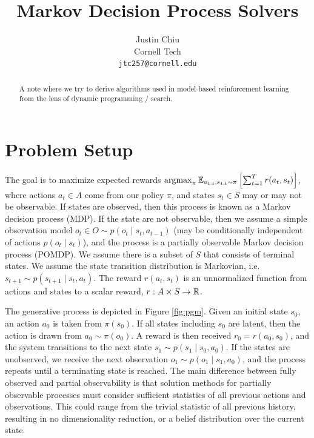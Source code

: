 \documentclass[11pt]{article}
\title{Markov Decision Process Solvers}
\author{Justin Chiu \\
  Cornell Tech \\
  \texttt{jtc257@cornell.edu}}
\begin{document}
\maketitle
\begin{abstract}
A note where we try to derive algorithms used in model-based reinforcement learning
from the lens of dynamic programming / search.
\end{abstract}

\section{Problem Setup}
The goal is to maximize expected rewards $\operatorname*{argmax}_\pi \mathbb{E}_{a_{1:t},s_{1:t}\sim\pi}\left[\sum_{t=1}^T r(a_t, s_t)\right]$,
where actions $a_t\in A$ come from our policy $\pi$,
and states $s_t\in S$ may or may not be observable.
If states are observed, then this process is known as a Markov decision process (MDP).
If the state are not observable,
then we assume a simple observation model $o_t\in O \sim p(o_t \mid s_t, a_{t-1})$
(may be conditionally independent of actions $p(o_t \mid s_t)$),
and the process is a partially observable Markov decision process (POMDP).
We assume there is a subset of $S$ that consists of terminal states.
We assume the state transition distribution is Markovian, i.e. $s_{t+1} \sim p(s_{t+1} \mid s_t, a_t)$.
The reward $r(a_t, s_t)$ is an unnormalized function from actions and states to a scalar
reward, $r: A\times S \to \mathbb{R}$.

The generative process is depicted in Figure \ref{fig:pgm}.
Given an initial state $s_0$, an action $a_0$ is taken from $\pi(s_0)$.
If all states including $s_0$ are latent, then the action is drawn from $a_0\sim \pi(o_0)$.
A reward is then received $r_0 = r(a_0, s_0)$,
and the system transitions to the next state $s_1 \sim p(s_1\mid s_0, a_0)$.
If the states are unobserved, we receive the next observation $o_1\sim p(o_1\mid s_1, a_0)$,
and the process repeats until a terminating state is reached.
The main difference between fully observed and partial observability is that
solution methods for partially observable processes must consider
sufficient statistics of all previous actions and observations.
This could range from the trivial statistic of all previous history,
resulting in no dimensionality reduction,
or a belief distribution over the current state.
\end{document}
